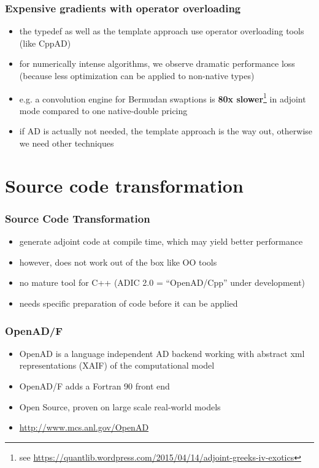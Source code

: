 \documentclass[10pt,German]{beamer}
\begin{document}
\begin{frame}[fragile]
\frametitle{Expensive gradients with operator overloading}
\begin{itemize}
\item the typedef as well as the template approach use operator overloading tools (like CppAD)
\item for numerically intense algorithms, we observe dramatic performance loss (because less optimization can be applied to non-native types)
\item e.g. a convolution engine for Bermudan swaptions is \textbf{80x slower}\footnote{see \tiny\url{https://quantlib.wordpress.com/2015/04/14/adjoint-greeks-iv-exotics}}
in adjoint mode compared to one native-double pricing
\item if AD is actually not needed, the template approach is the way out, otherwise we need other techniques
\end{itemize}
\end{frame}

\section{Source code transformation}

\begin{frame}[fragile]
\frametitle{Source Code Transformation}
\begin{itemize}
\item generate adjoint code at compile time, which may yield better performance
\item however, does not work out of the box like OO tools
\item no mature tool for C++ (ADIC 2.0 = ``OpenAD/Cpp'' under development)
\item needs specific preparation of code before it can be applied
\end{itemize}
\end{frame}

\begin{frame}[fragile]
\frametitle{OpenAD/F}
\begin{itemize}
\item OpenAD is a language independent AD backend working with abstract xml representations (XAIF) of the computational model
\item OpenAD/F adds a Fortran 90 front end
\item Open Source, proven on large scale real-world models
\item \url{http://www.mcs.anl.gov/OpenAD}
\end{itemize}
\end{frame}
\end{document}
